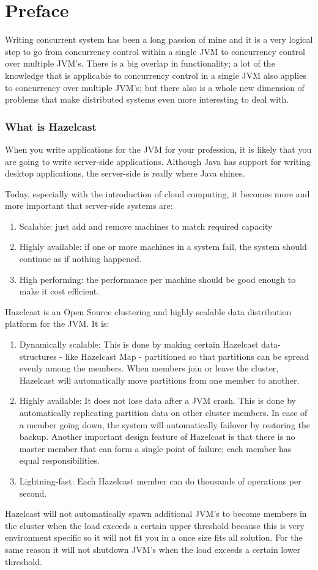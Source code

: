 \chapter*{Preface}
Writing concurrent system has been a long passion of mine and it is a very logical step to go from concurrency control within a single JVM to concurrency control over multiple JVM's. There is a big overlap in functionality; a lot of the knowledge that is applicable to concurrency control in a single JVM also applies to concurrency over multiple JVM's; but there also is a whole new dimension of problems that make distributed systems even more interesting to deal with. 
\subsection*{What is Hazelcast}
When you write applications for the JVM for your profession, it is likely that you are going to write server-side applications. Although Java has support for writing desktop applications, the server-side is really where Java shines.

Today, especially with the introduction of cloud computing, it becomes more and more important that server-side systems are:
\begin{enumerate}
\item Scalable: just add and remove machines to match required capacity 
\item Highly available: if one or more machines in a system fail, the system should continue as if nothing happened.
\item High performing: the performance per machine should be good enough to make it cost efficient.
\end{enumerate}

Hazelcast is an Open Source clustering and highly scalable data distribution platform for the JVM. It is:
\begin{enumerate}
\item Dynamically scalable: This is done by making certain Hazelcast data-structures - like Hazelcast Map - partitioned so that partitions can be spread evenly among the members. When members join or leave the cluster, Hazelcast will automatically move partitions from one member to another.
\item Highly available: It does not lose data after a JVM crash. This is done by automatically replicating partition data on other cluster members. In case of a member going down, the system will automatically failover by restoring the backup. Another important design feature of Hazelcast is that there is no master member that can form a single point of failure; each member has equal responsibilities.
\item Lightning-fast: Each Hazelcast member can do thousands of operations per second.
\end{enumerate}
Hazelcast will not automatically spawn additional JVM's to become members in the cluster when the load exceeds a certain upper threshold because this is very environment specific so it will not fit you in a once size fits all solution. For the same reason it will not shutdown JVM's when the load exceeds a certain lower threshold.

